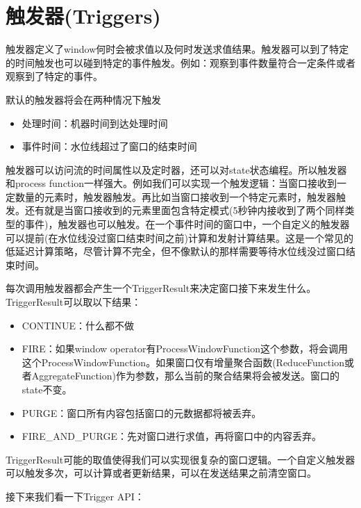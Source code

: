 \documentclass[oneside]{ctexbook}
\begin{document}
\section{触发器(Triggers)}

触发器定义了window何时会被求值以及何时发送求值结果。触发器可以到了特定的时间触发也可以碰到特定的事件触发。例如：观察到事件数量符合一定条件或者观察到了特定的事件。

默认的触发器将会在两种情况下触发

\begin{itemize}
  \item 处理时间：机器时间到达处理时间
  \item 事件时间：水位线超过了窗口的结束时间
\end{itemize}

触发器可以访问流的时间属性以及定时器，还可以对state状态编程。所以触发器和process function一样强大。例如我们可以实现一个触发逻辑：当窗口接收到一定数量的元素时，触发器触发。再比如当窗口接收到一个特定元素时，触发器触发。还有就是当窗口接收到的元素里面包含特定模式(5秒钟内接收到了两个同样类型的事件)，触发器也可以触发。在一个事件时间的窗口中，一个自定义的触发器可以提前(在水位线没过窗口结束时间之前)计算和发射计算结果。这是一个常见的低延迟计算策略，尽管计算不完全，但不像默认的那样需要等待水位线没过窗口结束时间。

每次调用触发器都会产生一个TriggerResult来决定窗口接下来发生什么。TriggerResult可以取以下结果：

\begin{itemize}
  \item CONTINUE：什么都不做
  \item FIRE：如果window operator有ProcessWindowFunction这个参数，将会调用这个ProcessWindowFunction。如果窗口仅有增量聚合函数(ReduceFunction或者AggregateFunction)作为参数，那么当前的聚合结果将会被发送。窗口的state不变。
  \item PURGE：窗口所有内容包括窗口的元数据都将被丢弃。
  \item FIRE\_AND\_PURGE：先对窗口进行求值，再将窗口中的内容丢弃。
\end{itemize}

TriggerResult可能的取值使得我们可以实现很复杂的窗口逻辑。一个自定义触发器可以触发多次，可以计算或者更新结果，可以在发送结果之前清空窗口。

接下来我们看一下Trigger API：
\end{document}
